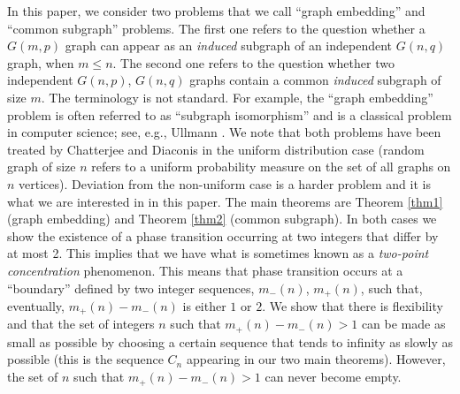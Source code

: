 \documentclass[reqno]{amsart}
\def\red{\color{red}}
\theoremstyle{theorem}
\theoremstyle{definition}
\theoremstyle{remark}
\newcommand{\1}{{\text{\Large $\mathfrak 1$}}}	%
\numberwithin{equation}{section}
\begin{document}
In this paper, we consider two problems that we call
{``graph embedding'' and ``common subgraph'' problems.}
The first one refers to the question whether a $G(m,p)$ graph
can appear as an {\em induced} subgraph of an independent $G(n,q)$ graph,
when $m \le n$.
The second one refers to the question whether two independent 
$G(n,p)$, $G(n,q)$ graphs contain a common {\em induced} subgraph
of size $m$. 
The terminology is not standard. For example, the ``graph embedding'' 
problem is often referred to as ``subgraph isomorphism'' and is a classical
problem in computer science; see, e.g., Ullmann \cite{ULL76}.
We note that both problems have been treated by Chatterjee and Diaconis
\cite{ChD23} in the uniform distribution case (random graph of size $n$
refers to a uniform probability measure on the set of all graphs on
$n$ vertices). Deviation from the non-uniform case is a harder problem and
it is what we are interested in in this paper.
The main theorems are  Theorem \ref{thm1} (graph embedding)
and Theorem \ref{thm2} (common subgraph).
In both cases we show the existence of a phase transition
occurring at two integers that differ by at most 2.
This implies that we have what is sometimes known as a
{\em two-point concentration} phenomenon. 
This means that phase transition occurs at a ``boundary''
defined by two integer sequences, $m_-(n)$, $m_+(n)$, such
that, eventually, $m_+(n) - m_-(n)$ is either $1$ or $2$.
We show that there is flexibility and that the set of integers $n$
such that $m_+(n) - m_-(n) > 1$ can be made as small as possible
by choosing a certain sequence that tends to infinity as slowly as possible
(this is the sequence $C_n$ appearing in our two main theorems).
However, the set of $n$ such that $m_+(n) - m_-(n) > 1$ can 
never become empty.


%
\end{document}
